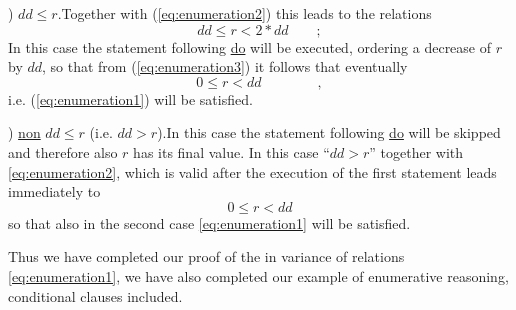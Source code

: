 ) $dd \leq r$.\qquad Together with (\ref{eq:enumeration2}) this leads to the
relations
\begin{equation}
    dd \leq r < 2*dd\qquad;\label{eq:enumeration3}
\end{equation}
In this case the statement following \underline{do} will be executed,
ordering a decrease of $r$ by $dd$, so that from (\ref{eq:enumeration3})
it follows that eventually
\begin{equation*}
    0 \leq r < dd\qquad\qquad,
\end{equation*}
i.e. (\ref{eq:enumeration1}) will be satisfied.

) \underline{non} $dd \leq r$ (i.e. $dd > r$).\qquad In this case the
statement following \underline{do} will be skipped and therefore also $r$ has
its final value. In this case ``$dd > r$'' together with \eqref{eq:enumeration2},
which is valid after the execution of the first statement leads immediately to
\begin{equation*}
    0 \leq r < dd
\end{equation*}
so that also in the second case \eqref{eq:enumeration1} will be satisfied.

Thus we have completed our proof of the in variance of relations
\eqref{eq:enumeration1}, we have also completed our example of enumerative
reasoning, conditional clauses included.